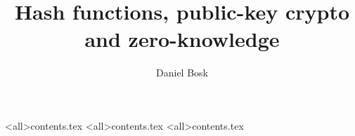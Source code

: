 \title{%
  Hash functions, public-key crypto and zero-knowledge
}
\author{Daniel Bosk}


\mode*

\begin{abstract}
  
\end{abstract}

\begin{frame}
  \tableofcontents
\end{frame}


\mode<all>{{contents.tex}}
\mode<all>{{contents.tex}}
\mode<all>{{contents.tex}}



\begin{frame}[allowframebreaks]
  \printbibliography
\end{frame}
